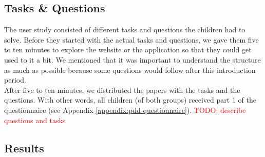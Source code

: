 \subsection{Tasks \& Questions}
The user study consisted of different tasks and questions the children had to solve. Before they started with the actual tasks and questions, we gave them five to ten minutes to explore the website or the application so that they could get used to it a bit. We mentioned that it was important to understand the structure as much as possible because some questions would follow after this introduction period.\\

After five to ten minutes, we distributed the papers with the tasks and the questions. With other words, all children (of both groups) received part 1 of the questionnaire (see Appendix \ref{appendix:pdd-questionnaire}). \textcolor{red}{TODO: describe questions and tasks}\\



\subsection{Results}



